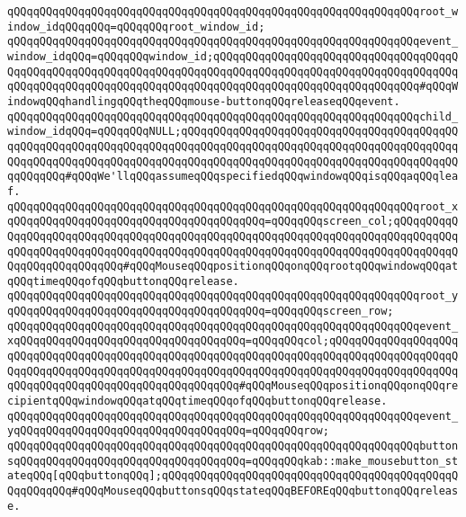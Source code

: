\verb|qQQqqQQqqQQqqQQqqQQqqQQqqQQqqQQqqQQqqQQqqQQqqQQqqQQqqQQqqQQqqQQqroot_window_idqQQqqQQq=qQQqqQQqroot_window_id;|\newline
\verb|qQQqqQQqqQQqqQQqqQQqqQQqqQQqqQQqqQQqqQQqqQQqqQQqqQQqqQQqqQQqqQQqevent_window_idqQQq=qQQqqQQqwindow_id;qQQqqQQqqQQqqQQqqQQqqQQqqQQqqQQqqQQqqQQqqQQqqQQqqQQqqQQqqQQqqQQqqQQqqQQqqQQqqQQqqQQqqQQqqQQqqQQqqQQqqQQqqQQqqQQqqQQqqQQqqQQqqQQqqQQqqQQqqQQqqQQqqQQqqQQqqQQqqQQqqQQqqQQqqQQq#qQQqWindowqQQqhandlingqQQqtheqQQqmouse-buttonqQQqreleaseqQQqevent.|\newline
\verb|qQQqqQQqqQQqqQQqqQQqqQQqqQQqqQQqqQQqqQQqqQQqqQQqqQQqqQQqqQQqqQQqchild_window_idqQQq=qQQqqQQqNULL;qQQqqQQqqQQqqQQqqQQqqQQqqQQqqQQqqQQqqQQqqQQqqQQqqQQqqQQqqQQqqQQqqQQqqQQqqQQqqQQqqQQqqQQqqQQqqQQqqQQqqQQqqQQqqQQqqQQqqQQqqQQqqQQqqQQqqQQqqQQqqQQqqQQqqQQqqQQqqQQqqQQqqQQqqQQqqQQqqQQqqQQqqQQqqQQq#qQQqWe'llqQQqassumeqQQqspecifiedqQQqwindowqQQqisqQQqaqQQqleaf.|\newline
\verb|qQQqqQQqqQQqqQQqqQQqqQQqqQQqqQQqqQQqqQQqqQQqqQQqqQQqqQQqqQQqqQQqroot_xqQQqqQQqqQQqqQQqqQQqqQQqqQQqqQQqqQQqqQQq=qQQqqQQqscreen_col;qQQqqQQqqQQqqQQqqQQqqQQqqQQqqQQqqQQqqQQqqQQqqQQqqQQqqQQqqQQqqQQqqQQqqQQqqQQqqQQqqQQqqQQqqQQqqQQqqQQqqQQqqQQqqQQqqQQqqQQqqQQqqQQqqQQqqQQqqQQqqQQqqQQqqQQqqQQqqQQqqQQqqQQq#qQQqMouseqQQqpositionqQQqonqQQqrootqQQqwindowqQQqatqQQqtimeqQQqofqQQqbuttonqQQqrelease.|\newline
\verb|qQQqqQQqqQQqqQQqqQQqqQQqqQQqqQQqqQQqqQQqqQQqqQQqqQQqqQQqqQQqqQQqroot_yqQQqqQQqqQQqqQQqqQQqqQQqqQQqqQQqqQQqqQQq=qQQqqQQqscreen_row;|\newline
\verb|qQQqqQQqqQQqqQQqqQQqqQQqqQQqqQQqqQQqqQQqqQQqqQQqqQQqqQQqqQQqqQQqevent_xqQQqqQQqqQQqqQQqqQQqqQQqqQQqqQQqqQQq=qQQqqQQqcol;qQQqqQQqqQQqqQQqqQQqqQQqqQQqqQQqqQQqqQQqqQQqqQQqqQQqqQQqqQQqqQQqqQQqqQQqqQQqqQQqqQQqqQQqqQQqqQQqqQQqqQQqqQQqqQQqqQQqqQQqqQQqqQQqqQQqqQQqqQQqqQQqqQQqqQQqqQQqqQQqqQQqqQQqqQQqqQQqqQQqqQQqqQQqqQQqqQQq#qQQqMouseqQQqpositionqQQqonqQQqrecipientqQQqwindowqQQqatqQQqtimeqQQqofqQQqbuttonqQQqrelease.|\newline
\verb|qQQqqQQqqQQqqQQqqQQqqQQqqQQqqQQqqQQqqQQqqQQqqQQqqQQqqQQqqQQqqQQqevent_yqQQqqQQqqQQqqQQqqQQqqQQqqQQqqQQqqQQq=qQQqqQQqrow;|\newline
\verb|qQQqqQQqqQQqqQQqqQQqqQQqqQQqqQQqqQQqqQQqqQQqqQQqqQQqqQQqqQQqqQQqbuttonsqQQqqQQqqQQqqQQqqQQqqQQqqQQqqQQqqQQq=qQQqqQQqkab::make_mousebutton_stateqQQq[qQQqbuttonqQQq];qQQqqQQqqQQqqQQqqQQqqQQqqQQqqQQqqQQqqQQqqQQqqQQqqQQqqQQq#qQQqMouseqQQqbuttonsqQQqstateqQQqBEFOREqQQqbuttonqQQqrelease.|\newline
\newline
